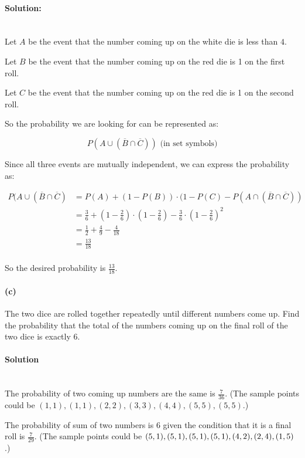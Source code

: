\documentclass[a4paper, 11pt, twoside]{article}
\begin{document}
\paragraph{Solution:}\ \\

Let $A$ be the event that the number coming up on the white die is less than $4$.

Let $B$ be the event that the number coming up on the red die is 1 on the first roll.

Let $C$ be the event that the number coming up on the red die is 1 on the second roll.

So the probability we are looking for can be represented as:

\[P(A \cup (\overline{B} \cap \overline{C})) \text{ (in set symbols)}\]

Since all three events are mutually independent, we can express the probability as:

\[
\begin{split}
	P(A \cup (\overline{B} \cap \overline{C}) &= P(A) + (1-P(B))\cdot(1-P(C)-P(A\cap (\overline{B}\cap\overline{C}))\\
	&= \frac{3}{6} + (1-\frac{2}{6})\cdot(1-\frac{2}{6})-\frac36\cdot(1-\frac26)^2\\
	&= \frac{1}{2} + \frac{4}{9}-\frac4{18}\\
	&= \frac{13}{18}\\
\end{split}
\]

So the desired probability is $\frac{13}{18}.$

\paragraph{(c)} The two dice are rolled together repeatedly until different numbers come up. Find the probability that the total of the numbers coming up on the final roll of the two dice is exactly $6$.\\

\paragraph{Solution}\ \\

The probability of two coming up numbers are the same is $\frac{7}{36}$. (The sample points could be $(1,1), (1,1), (2,2), (3,3), (4,4), (5,5), (5,5)$.)

The probability of sum of two numbers is $6$ given the condition that it is a final roll is $\frac{7}{29}$. (The sample points could be $(5,1), (5,1),(5,1), (5,1),\\ (4,2), (2,4), (1,5)$.)
\end{document}
